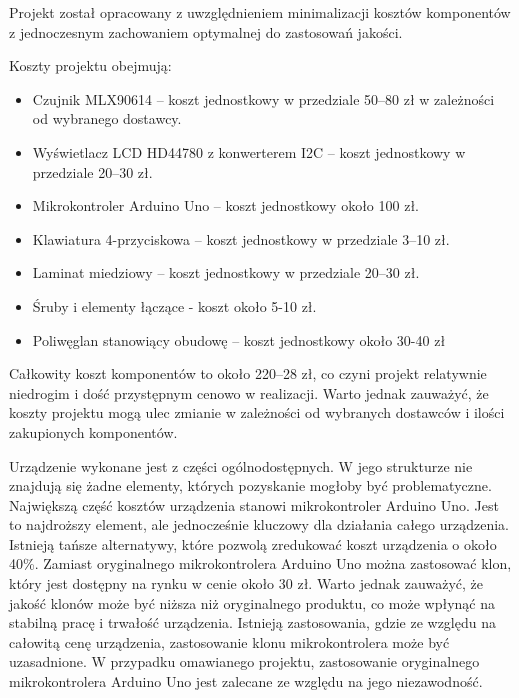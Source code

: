 Projekt został opracowany z uwzględnieniem minimalizacji kosztów komponentów z jednoczesnym zachowaniem optymalnej do zastosowań jakości.

\vspace{12pt}

Koszty projektu obejmują: 

\begin{itemize}
    \item Czujnik MLX90614 – koszt jednostkowy w przedziale 50–80 zł w zależności od wybranego dostawcy.
    \vspace{12pt}
    \item Wyświetlacz LCD HD44780 z konwerterem I2C – koszt jednostkowy w przedziale 20–30 zł.
    \vspace{12pt}
    \item Mikrokontroler Arduino Uno – koszt jednostkowy około 100 zł.
    \vspace{12pt}
    \item Klawiatura 4-przyciskowa – koszt jednostkowy w przedziale 3–10 zł.
    \vspace{12pt} 
    \item Laminat miedziowy – koszt jednostkowy w przedziale 20–30 zł.
    \vspace{12pt}
    \item Śruby i elementy łączące - koszt około 5-10 zł.
    \vspace{12pt}
    \item Poliwęglan stanowiący obudowę – koszt jednostkowy około 30-40 zł
\end{itemize}

\vspace{24pt}

Całkowity koszt komponentów to około 220–28 zł, co czyni projekt relatywnie niedrogim i dość przystępnym cenowo w realizacji. Warto jednak zauważyć, że koszty projektu mogą ulec zmianie w zależności od wybranych dostawców i ilości zakupionych komponentów. 

\vspace{12pt}

Urządzenie wykonane jest z części ogólnodostępnych. W jego strukturze nie znajdują się żadne elementy, których pozyskanie mogłoby być problematyczne. Największą część kosztów urządzenia stanowi mikrokontroler Arduino Uno. Jest to najdroższy element, ale jednocześnie kluczowy dla działania całego urządzenia. Istnieją tańsze alternatywy, które pozwolą zredukować koszt urządzenia o około 40\%. Zamiast oryginalnego mikrokontrolera Arduino Uno można zastosować klon, który jest dostępny na rynku w cenie około 30 zł. Warto jednak zauważyć, że jakość klonów może być niższa niż oryginalnego produktu, co może wpłynąć na stabilną pracę i trwałość urządzenia. Istnieją zastosowania, gdzie ze względu na całowitą cenę urządzenia, zastosowanie klonu mikrokontrolera może być uzasadnione. W przypadku omawianego projektu, zastosowanie oryginalnego mikrokontrolera Arduino Uno jest zalecane ze względu na jego niezawodność.